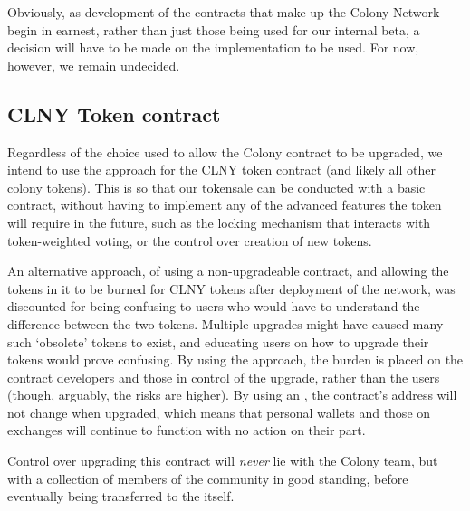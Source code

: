 Obviously, as development of the contracts that make up the Colony Network begin in earnest, rather than just those being used for our internal beta, a decision will have to be made on the implementation to be used. For now, however, we remain undecided.

\subsection{CLNY Token contract}\label{app:clnyupagrade}
Regardless of the choice used to allow the Colony contract to be upgraded, we intend to use the  approach for the CLNY token contract (and likely all other colony tokens). This is so that our tokensale can be conducted with a basic contract, without having to implement any of the advanced features the token will require in the future, such as the locking mechanism that interacts with token-weighted voting, or the control over creation of new tokens.

An alternative approach, of using a non-upgradeable contract, and allowing the tokens in it to be burned for CLNY tokens after deployment of the network, was discounted for being confusing to users who would have to understand the difference between the two tokens. Multiple upgrades might have caused many such `obsolete' tokens to exist, and educating users on how to upgrade their tokens would prove confusing. By using the  approach, the burden is placed on the contract developers and those in control of the upgrade, rather than the users (though, arguably, the risks are higher). By using an , the contract's address will not change when upgraded, which means that personal wallets and those on exchanges will continue to function with no action on their part.

Control over upgrading this contract will \emph{never} lie with the Colony team, but with a collection of members of the community in good standing, before eventually being transferred to the \rc itself. 